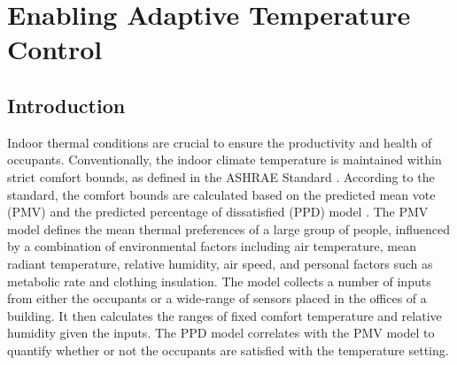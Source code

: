 
% 


%
					





\chapter{Enabling Adaptive Temperature Control}
\label{cha:atc}

\section{Introduction}

Indoor thermal conditions are crucial to ensure the productivity and health of occupants. Conventionally, the indoor climate temperature is maintained within strict comfort bounds, as defined in the ASHRAE Standard \citep{ashrae2013thermal}. According to the standard, the comfort bounds are calculated based on the predicted mean vote (PMV) and the predicted percentage of dissatisfied (PPD) model \citep{fanger1970thermal}. The PMV model defines the mean thermal preferences of a large group of people, influenced by a combination of environmental factors including air temperature, mean radiant temperature, relative humidity, air speed, and personal factors such as metabolic rate and clothing insulation. The model collects a number of inputs from either the occupants or a wide-range of sensors placed in the offices of a building. It then calculates the ranges of fixed comfort temperature and relative humidity given the inputs. The PPD model correlates with the PMV model to quantify whether or not the occupants are satisfied with the temperature setting.

